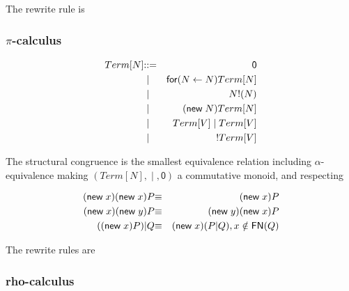 The rewrite rule is
\begin{mathpar}
\end{mathpar}

\subsubsection{$\pi$-calculus}

\begin{eqnarray*}
  Term[N] & \bc & \mathsf{0} \\
  & \;\bm\; & \mathsf{for}\mathsf{(}N \leftarrow N\mathsf{)}Term[N] \\
  & \;\bm\; & N\mathsf{!}\mathsf{(}N\mathsf{)} \\
  & \;\bm\; & \mathsf{(}\mathsf{new}\; N\mathsf{)}Term[N] \\
  & \;\bm\; & Term[V] \; \mathsf{|}\; Term[V] \\
  & \;\bm\; & \mathsf{!}Term[V]
\end{eqnarray*}

The structural congruence is the smallest equivalence relation including $\alpha$-equivalence making $(Term[N],\;\mathsf{|}\;,\mathsf{0})$ a commutative monoid, and respecting

\begin{eqnarray*}
  \mathsf{(}\mathsf{new}\; x\mathsf{)}\mathsf{(}\mathsf{new}\; x\mathsf{)}P & \scong & \mathsf{(}\mathsf{new}\; x\mathsf{)}P \\
  \mathsf{(}\mathsf{new}\; x\mathsf{)}\mathsf{(}\mathsf{new}\; y\mathsf{)}P & \scong & \mathsf{(}\mathsf{new}\; y\mathsf{)}\mathsf{(}\mathsf{new}\; x\mathsf{)}P \\
  (\mathsf{(}\mathsf{new}\; x\mathsf{)}P)\mathsf{|}Q & \scong & \mathsf{(}\mathsf{new}\; x\mathsf{)}(P\mathsf{|}Q), x \notin \freenames{Q}
\end{eqnarray*}  

The rewrite rules are

\subsubsection{rho-calculus}

